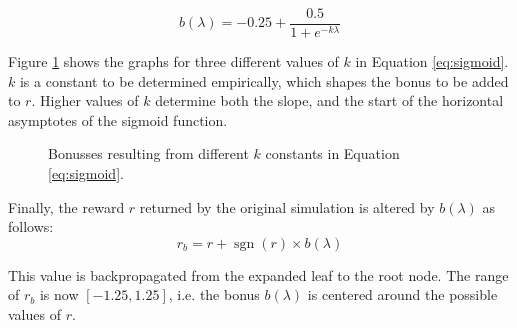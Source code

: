 \documentclass{ecai2010}
\newcommand{\sgn}{\mathop{\mathrm{sgn}}}
\begin{document}
\begin{equation}
b(\lambda) = -0.25 + \frac{0.5}{1+e^{-k\lambda}}
\label{eq:sigmoid}
\end{equation}

Figure \ref{fig:sigmoids} shows the graphs for three different values of $k$ in Equation \ref{eq:sigmoid}. $k$ is a constant to be determined empirically, which shapes the bonus to be added to $r$. Higher values of $k$ determine both the slope, and the start of the horizontal asymptotes of the sigmoid function.

\begin{figure}[ht]
\centering
{}
    \caption{Bonusses resulting from different $k$ constants in Equation \ref{eq:sigmoid}.}
	\label{fig:sigmoids}
\end{figure}

Finally, the reward $r$ returned by the original simulation is altered by $b(\lambda)$ as follows:
\begin{equation}
r_b = r + \sgn(r) \times b(\lambda)
\end{equation}

This value is backpropagated from the expanded leaf to the root node. The range of $r_b$ is now $[-1.25, 1.25]$, i.e. the bonus $b(\lambda)$ is centered around the possible values of $r$.
\end{document}
